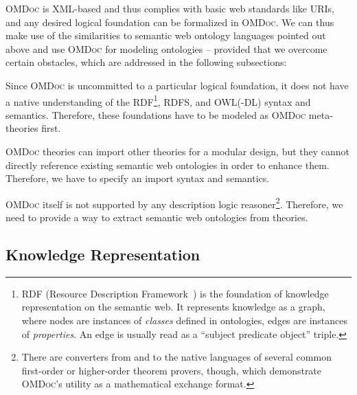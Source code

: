 \documentclass{llncs}
\renewcommand{\omdoc}{\textsc{OMDoc}\xspace}
\begin{document}
\omdoc is XML-based and thus complies with basic web standards like URIs, and any desired
logical foundation can be formalized in \omdoc. We can thus make use of the similarities
to semantic web ontology languages pointed out above and use \omdoc for modeling
ontologies -- provided that we overcome certain obstacles, which are addressed in the
following subsections:
\begin{inparaenum}
\item Since \omdoc is uncommitted to a particular logical foundation, it does not have a
  native understanding of the RDF\footnote{RDF (Resource Description
    Framework~\cite{w3c:rdf}) is the foundation of knowledge representation on the
    semantic web.  It represents knowledge as a graph, where nodes are instances of
    \emph{classes} defined in ontologies, edges are instances of \emph{properties}.  An
    edge is usually read as a ``subject predicate object'' triple.}, RDFS, and OWL(-DL)
  syntax and semantics.  Therefore, these foundations have to be modeled as \omdoc
  meta-theories first.
\item \omdoc theories can import other theories for a modular design, but they cannot
  directly reference existing semantic web ontologies in order to enhance them.
  Therefore, we have to specify an import syntax and semantics.
\item \omdoc itself is not supported by any description logic reasoner\footnote{There are
    converters from and to the native languages of several common first-order or
    higher-order theorem provers, though, which demonstrate \omdoc's utility as a
    mathematical exchange format.}.  Therefore, we need to provide a way to extract
  semantic web ontologies from theories.
\end{inparaenum}

\subsection{Knowledge Representation}\label{sec:knowledge-representation}
\end{document}
